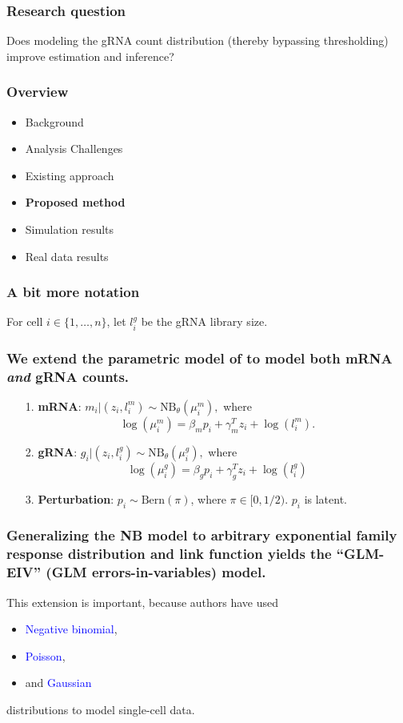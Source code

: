 \documentclass{beamer}
\begin{document}

\begin{frame}
\frametitle{Research question}
Does modeling the gRNA count distribution (thereby bypassing thresholding) improve estimation and inference?
\end{frame}


\begin{frame}
\frametitle{Overview}
\begin{itemize}
\item Background
\item Analysis Challenges
\item Existing approach
\item \textbf{Proposed method}
\item Simulation results
\item Real data results
\end{itemize}
\end{frame}


\begin{frame}
\frametitle{A bit more notation}
For cell $i \in \{ 1, \dots, n\}$, let $l^g_i$ be the gRNA library size.
\end{frame}

\begin{frame}
\frametitle{We extend the parametric model of \cite{Sarkar2021} to model both mRNA \textit{and} gRNA counts.}
\begin{itemize}
\item[1.] \textbf{mRNA}: $m_i | (z_i, l_i^m) \sim \textrm{NB}_\theta(\mu^m_i),$ where $$ \log\left( \mu^m_i \right) = \beta_m p_i + \gamma_m^T z_i + \log(l^m_i).$$
\item[2.] \textbf{gRNA}: $g_i | (z_i, l_i^g) \sim \textrm{NB}_\theta (\mu_i^g),$ where $$\log(\mu_i^g) = \beta_g p_i + \gamma_g^T z_i + \log(l_i^g)$$
\item[3.] \textbf{Perturbation}: $p_i \sim \textrm{Bern}(\pi)$, where $\pi \in [0, 1/2)$. $p_i$ is latent.
\end{itemize}
\end{frame}

\begin{frame}
\frametitle{Generalizing the NB model to arbitrary exponential family response distribution and link function yields the ``GLM-EIV'' (GLM errors-in-variables) model.}

This extension is important, because authors have used
\begin{itemize}
\item \textcolor{blue}{Negative binomial}, \cite{Choudhary2021}
\item \textcolor{blue}{Poisson}, \cite{Schraivogel2020}
\item and \textcolor{blue}{Gaussian} \cite{Lin2021}
\end{itemize}
distributions to model single-cell data.
\end{frame}
\end{document}

